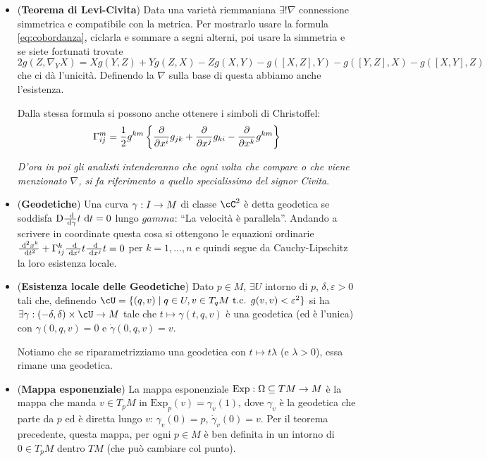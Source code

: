 \documentclass[a4paper,NoNotes,GeneralMath]{stdmdoc}
\newcommand{\Dde}[1]{\ensuremath{\text{D} {#1}}{\de t}}
\newcommand{\Exp}{\ensuremath{\text{Exp}}}
\begin{document}
\begin{itemize}
\item ({\bf Teorema di Levi-Civita}) Data una varietà riemmaniana $\exists! \nabla$ connessione simmetrica e compatibile con la metrica. Per mostrarlo usare la formula \ref{eq:cobordanza}, ciclarla e sommare a segni alterni, poi usare la simmetria e se siete fortunati trovate
  \begin{equation}
    \label{eq:levi_civita}
    2 g(Z, \nabla_Y X) = X g(Y, Z) + Y g(Z, X) - Z g(X, Y) - g([X, Z], Y) - g([Y, Z], X) - g([X, Y], Z)
  \end{equation}
  che ci dà l'unicità. Definendo la $\nabla$ sulla base di questa abbiamo anche l'esistenza.

  Dalla stessa formula si possono anche ottenere i simboli di Christoffel:
  $$ \Gamma_{ij}^m = \frac{1}{2} g^{km} \left\{ \dpar{}{x^i} g_{jk} + \dpar{}{x^j} g_{ki} - \dpar{}{x^k} g^{km} \right\} $$

  {\it D'ora in poi gli analisti intenderanno che ogni volta che compare o che viene menzionato $\nabla$, si fa riferimento a quello specialissimo del signor Civita}.
\item ({\bf Geodetiche}) Una curva $\gamma: I \rightarrow M$ di classe $\cC^2$ è detta geodetica se soddisfa $\Dde{\dde{\gamma}{t}} = 0$ lungo $gamma$: ``La velocità è parallela''. Andando a scrivere in coordinate questa cosa si ottengono le equazioni ordinarie $\frac{\de^2 x^k}{\de t^2} + \Gamma_{ij}^k \dde{x^i}{t} \dde{x^j}{t} = 0$ per $k = 1, \ldots, n$ e quindi segue da Cauchy-Lipschitz la loro esistenza locale.
\item ({\bf Esistenza locale delle Geodetiche}) Dato $p \in M$, $\exists U$ intorno di $p$, $\delta, \varepsilon > 0$ tali che, definendo $\cU = \{ (q, v) \mid q \in U, v \in T_q M \tc g(v, v) < \varepsilon^2 \}$ si ha $\exists \gamma: (- \delta, \delta) \times \cU \rar M$ tale che $t \mapsto \gamma(t, q, v)$ è una geodetica (ed è l'unica) con $\gamma(0, q, v) = 0$ e $\dot{\gamma}(0, q, v) = v$.

  Notiamo che se riparametrizziamo una geodetica con $t \mapsto t\lambda$ (e $\lambda > 0$), essa rimane una geodetica.
\item ({\bf Mappa esponenziale}) La mappa esponenziale $\Exp : \Omega \subseteq TM \rar M$ è la mappa che manda $v \in T_p M$ in $\Exp_p(v) = \gamma_v(1)$, dove $\gamma_v$ è la geodetica che parte da $p$ ed è diretta lungo $v$: $\gamma_v(0) = p$, $\dot{\gamma}_v(0) = v$. Per il teorema precedente, questa mappa, per ogni $p \in M$ è ben definita in un intorno di $0 \in T_p M$ dentro $TM$ (che può cambiare col punto).


\end{itemize}
\end{document}
